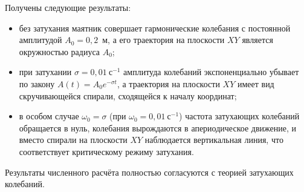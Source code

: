 \documentclass[a4paper]{article}
\begin{document}
Получены следующие результаты:
\begin{itemize}
    \item без затухания маятник совершает гармонические колебания с постоянной амплитудой $A_0 = 0{,}2$~м, а его траектория на плоскости $XY$ является окружностью радиуса $A_0$;
    \item при затухании $\sigma = 0{,}01~\text{с}^{-1}$ амплитуда колебаний экспоненциально убывает по закону $A(t) = A_0 e^{-\sigma t}$, а траектория на плоскости $XY$ имеет вид скручивающейся спирали, сходящейся к началу координат;
    \item в особом случае $\omega_0 = \sigma$ (при $\omega_0 = 0{,}01~\text{с}^{-1}$) частота затухающих колебаний обращается в нуль, колебания вырождаются в апериодическое движение, и вместо спирали на плоскости $XY$ наблюдается вертикальная линия, что соответствует критическому режиму затухания.
\end{itemize}

Результаты численного расчёта полностью согласуются с теорией затухающих колебаний.
\end{document}
